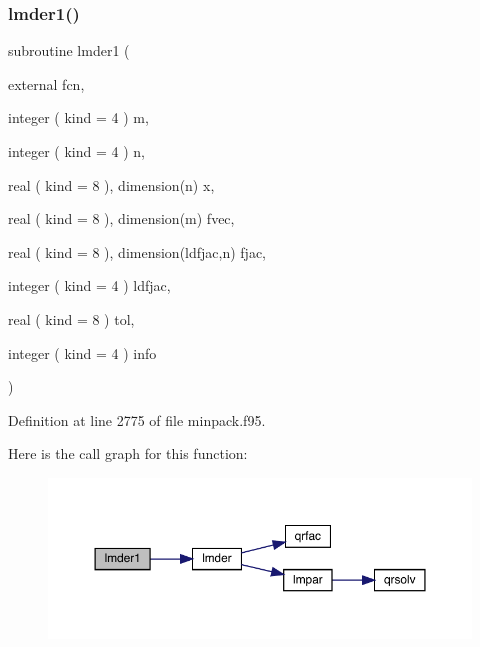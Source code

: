\subsubsection{\texorpdfstring{lmder1()}{lmder1()}}
{\footnotesize\ttfamily subroutine lmder1 (\begin{DoxyParamCaption}\item[{external}]{fcn,  }\item[{integer ( kind = 4 )}]{m,  }\item[{integer ( kind = 4 )}]{n,  }\item[{real ( kind = 8 ), dimension(n)}]{x,  }\item[{real ( kind = 8 ), dimension(m)}]{fvec,  }\item[{real ( kind = 8 ), dimension(ldfjac,n)}]{fjac,  }\item[{integer ( kind = 4 )}]{ldfjac,  }\item[{real ( kind = 8 )}]{tol,  }\item[{integer ( kind = 4 )}]{info }\end{DoxyParamCaption})}



Definition at line 2775 of file minpack.\+f95.

Here is the call graph for this function\+:\nopagebreak
\begin{figure}[H]
\begin{center}
\leavevmode
\includegraphics[width=350pt]{minpack_8f95_ab4dbf9a20a957dfb72d70219dd6ad6d4_cgraph}
\end{center}
\end{figure}
\mbox{\label{minpack_8f95_a4689c4ce455cf0795081e88c004b48ff}} 
